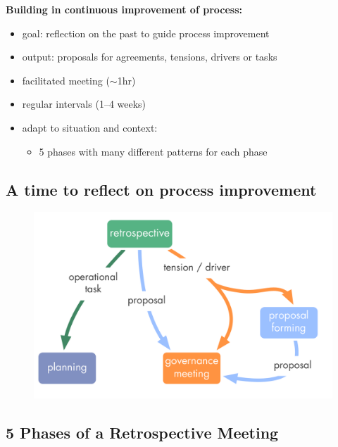 \textbf{Building in continuous improvement of process:}

\begin{itemize}
\item goal: reflection on the past to guide process improvement

\item output: proposals for agreements, tensions, drivers or tasks

\item facilitated meeting (\ensuremath{\sim}1hr)

\item regular intervals (1--4 weeks)

\item adapt to situation and context:

\begin{itemize}
\item 5 phases with many different patterns for each phase

\end{itemize}

\end{itemize}

\subsection{A time to reflect on process improvement}
\label{atimetoreflectonprocessimprovement}

\begin{figure}[htbp]
\centering
\includegraphics[keepaspectratio,width=\textwidth,height=0.75\textheight]{img/meetings/retrospective.png}
\end{figure}

\subsection{5 Phases of a Retrospective Meeting}
\label{5phasesofaretrospectivemeeting}

